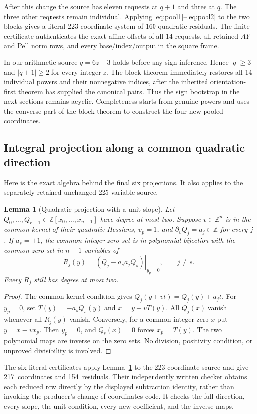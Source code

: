 \documentclass[11pt]{article}
\newtheorem{lemma}[theorem]{Lemma}
\theoremstyle{remark}\newtheorem{remark}[theorem]{Remark}
\newcommand{\DirectVars}{217}
\newcommand{\DirectRows}{154}
\begin{document}
After this change the source has eleven requests at $q+1$ and three at
$q$. The three other requests remain individual. Applying
\eqref{eq:pool1}--\eqref{eq:pool2} to the two blocks gives a literal
223-coordinate system of 160 quadratic residuals. The finite certificate
authenticates the exact affine offsets of all 14 requests, all retained
$AY$ and Pell norm rows, and every base/index/output in the square frame.

In our arithmetic source $q=6z+3$ holds before any sign inference.
Hence $|q|\ge3$ and $|q+1|\ge2$ for every integer $z$. The block
theorem immediately restores all 14 individual powers and their
nonnegative indices, after the inherited orientation-first theorem
has supplied the canonical pairs. Thus the sign bootstrap in the next
sections remains acyclic. Completeness starts from genuine powers and
uses the converse part of the block theorem to construct the four new
pooled coordinates.

\subsection{Integral projection along a common quadratic direction}

Here is the exact algebra behind the final six projections. It also
applies to the separately retained unchanged 225-variable source.

\begin{lemma}[Quadratic projection with a unit slope]\label{lem:projection}
Let $Q_0,\ldots,Q_{r-1}\in\mathbb Z[x_0,\ldots,x_{n-1}]$ have
degree at most two. Suppose $v\in\mathbb Z^n$ is in the common kernel
of their quadratic Hessians, $v_p=1$, and
$\partial_vQ_j=a_j\in\mathbb Z$ for every $j$.
If $a_s=\pm1$, the common integer zero set is in polynomial bijection
with the common zero set in $n-1$ variables of
\[
 R_j(y)=\left.(Q_j-a_sa_jQ_s)\right|_{y_p=0},\qquad j\ne s.
\]
Every $R_j$ still has degree at most two.
\end{lemma}
\begin{proof}
The common-kernel condition gives $Q_j(y+vt)=Q_j(y)+a_jt$.
For $y_p=0$, set $T(y)=-a_sQ_s(y)$ and $x=y+vT(y)$.
All $Q_j(x)$ vanish whenever all $R_j(y)$ vanish.
Conversely, for a common integer zero $x$ put $y=x-vx_p$.
Then $y_p=0$, and $Q_s(x)=0$ forces $x_p=T(y)$.
The two polynomial maps are inverse on the zero sets. No division,
positivity condition, or unproved divisibility is involved.
\end{proof}

The six literal certificates apply Lemma~\ref{lem:projection} to the
223-coordinate source and give \DirectVars\ coordinates and
\DirectRows\ residuals. Their independently written checker obtains
each reduced row directly by the displayed subtraction identity,
rather than invoking the producer's change-of-coordinates code.
It checks the full direction, every slope, the unit condition, every
new coefficient, and the inverse maps.
\end{document}
